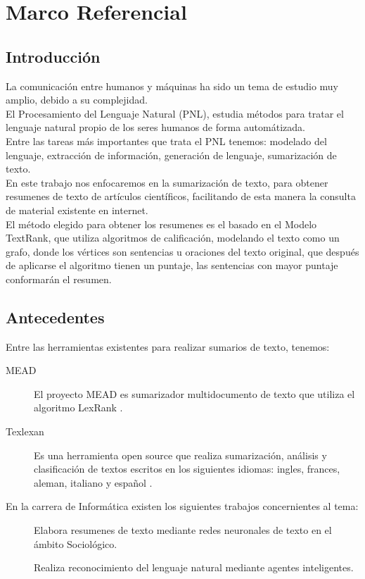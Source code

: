 \chapter{Marco Referencial}
\section{Introducci\'on}
La comunicaci\'on entre humanos y m\'aquinas ha sido un tema de estudio muy amplio,
debido a su complejidad. \\

El Procesamiento del Lenguaje Natural (PNL), estudia m\'etodos para tratar 
el lenguaje natural propio de los seres humanos de forma autom\'atizada. \\

Entre las tareas m\'as importantes que trata el PNL tenemos: modelado del lenguaje,
extracci\'on de informaci\'on, generaci\'on de lenguaje, sumarizaci\'on de texto. \\

En este trabajo nos enfocaremos en la sumarizaci\'on de texto, para obtener resumenes
de texto de art\'iculos cient\'ificos, facilitando de esta manera la consulta de
material existente en internet. \\

El m\'etodo elegido para obtener los resumenes es el basado en el Modelo TextRank,
que utiliza algoritmos de calificaci\'on, modelando el texto como un grafo, donde
los v\'ertices son sentencias u oraciones del texto original, que despu\'es de
aplicarse el algoritmo tienen un puntaje, las sentencias con mayor puntaje
conformar\'an el resumen.

\section{Antecedentes}
Entre las herramientas existentes para realizar sumarios de texto, tenemos:
\begin{description}
	\item[MEAD] El proyecto MEAD es sumarizador multidocumento de texto que utiliza
	el algoritmo LexRank \cite{MEAD}.
	\item[Texlexan] Es una herramienta open source que realiza sumarizaci\'on,
	an\'alisis y clasificaci\'on de textos escritos en los siguientes idiomas: ingles,
	frances, aleman, italiano y espa\~nol \cite{TEXLEXAN}.
\end{description}
En la carrera de Inform\'atica existen los siguientes trabajos concernientes al tema:\\
\begin{description}
	\item[\cite{EZ01}] Elabora resumenes de texto mediante redes neuronales de texto en el
	\'ambito Sociol\'ogico.
	\item[\cite{HM05}] Realiza reconocimiento del lenguaje natural mediante agentes
	inteligentes.
\end{description}

